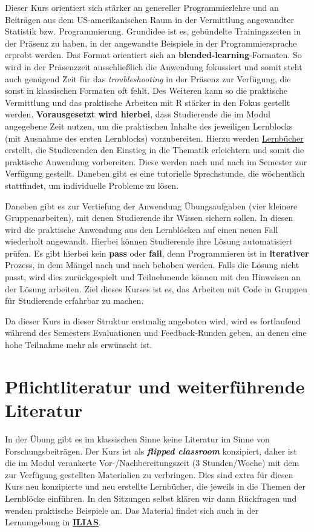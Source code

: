 \documentclass[11pt,a4paper]{article}
\begin{document}
Dieser Kurs orientiert sich stärker an genereller Programmierlehre und an Beiträgen aus dem US-amerikanischen Raum in der Vermittlung angewandter Statistik bzw. Programmierung. Grundidee ist es, gebündelte Trainingszeiten in der Präsenz zu haben, in der angewandte Beispiele in der Programmiersprache erprobt werden. Das Format orientiert sich an \textbf{blended-learning}-Formaten. So wird in der Präsenzzeit ausschließlich die Anwendung fokussiert und somit steht auch genügend Zeit für das \textit{troubleshooting} in der Präsenz zur Verfügung, die sonst in klassischen Formaten oft fehlt. Des Weiteren kann so die praktische Vermittlung und das praktische Arbeiten mit R stärker in den Fokus gestellt werden. \textbf{Vorausgesetzt wird hierbei}, dass Studierende die im Modul angegebene Zeit nutzen, um die praktischen Inhalte des jeweiligen Lernblocks (mit Ausnahme des ersten Lernblocks) vorzubereiten. Hierzu werden \href{https://lehre.bpkleer.de/statsplus/}{Lernbücher} erstellt, die Studierenden den Einstieg in die Thematik erleichtern und somit die praktische Anwendung vorbereiten. Diese werden nach und nach im Semester zur Verfügung gestellt. Daneben gibt es eine tutorielle Sprechstunde, die wöchentlich stattfindet, um individuelle Probleme zu lösen. 

Daneben gibt es zur Vertiefung der Anwendung Übungsaufgaben (vier kleinere Gruppenarbeiten), mit denen Studierende ihr Wissen sichern sollen. In diesen wird die praktische Anwendung aus den Lernblöcken auf einen neuen Fall wiederholt angewandt. Hierbei können Studierende ihre Lösung automatisiert prüfen. Es gibt hierbei kein \textbf{pass} oder \textbf{fail}, denn Programmieren ist in \textbf{iterativer} Prozess, in dem Mängel nach und nach behoben werden. Falls die Lösung nicht passt, wird dies zurückgespielt und Teilnehmende können mit den Hinweisen an der Lösung arbeiten. Ziel dieses Kurses ist es, das Arbeiten mit Code in Gruppen für Studierende erfahrbar zu machen.

Da dieser Kurs in dieser Struktur erstmalig angeboten wird, wird es fortlaufend während des Semesters Evaluationen und Feedback-Runden geben, an denen eine hohe Teilnahme mehr als erwünscht ist.
    
\section*{Pflichtliteratur und weiterführende Literatur}
In der Übung gibt es im klassischen Sinne keine Literatur im Sinne von Forschungsbeiträgen. Der Kurs ist als \textbf{\textit{flipped classroom}} konzipiert, daher ist die im Modul verankerte Vor-/Nachbereitungszeit (3 Stunden/Woche) mit dem zur Verfügung gestellten Materialien zu verbringen. Dies sind extra für diesen Kurs neu konzipierte und neu erstellte Lernbücher, die jeweils in die Themen der Lernblöcke einführen. In den Sitzungen selbst klären wir dann Rückfragen und wenden praktische Beispiele an. Das Material findet sich auch in der Lernumgebung in \href{https://ilias.uni-giessen.de/ilias/goto.php?target=crs_293249&client_id=JLUG}{\textbf{ILIAS}}. 
\end{document}
